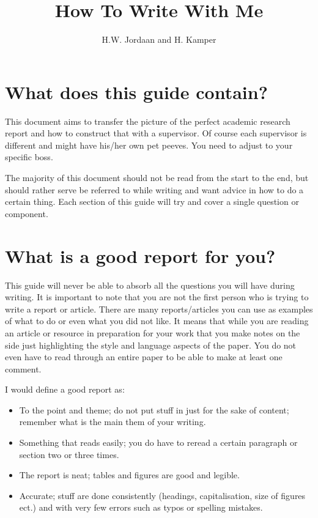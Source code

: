 \documentclass[12pt]{article}
\title{How To Write With Me}
\author{H.W. Jordaan and H. Kamper}
\begin{document}
\maketitle

\section*{What does this guide contain?}
This document aims to transfer the picture of the perfect academic research report and how to construct that with a supervisor.
Of course each supervisor is different and might have his/her own pet peeves.
You need to adjust to your specific boss.

The majority of this document should not be read from the start to the end, but should rather serve be referred to while writing and want advice in how to do a certain thing.
Each section of this guide will try and cover a single question or component.

\section*{What is a good report for you?}
This guide will never be able to absorb all the questions you will have during writing.
It is important to note that you are not the first person who is trying to write a report or article.
There are many reports/articles you can use as examples of what to do or even what you did not like.
It means that while you are reading an article or resource in preparation for your work that you make notes on the side just highlighting the style and language aspects of the paper.
You do not even have to read through an entire paper to be able to make at least one comment.

I would define a good report as:
\begin{itemize}
	\item To the point and theme; do not put stuff in just for the sake of content; remember what is the main them of your writing.
	\item Something that reads easily; you do have to reread a certain paragraph or section two or three times.
	\item The report is neat;  tables and figures are good and legible.
	\item Accurate;  stuff are done consistently (headings, capitalisation, size of figures ect.) and with very few errors such as typos or spelling mistakes.
\end{itemize}
\end{document}
